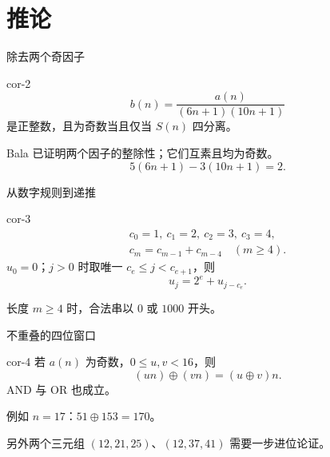 \documentclass{beamer}
\begin{document}
\section{推论}
\begin{frame}{除去两个奇因子}
\begin{bookresult}{cor-2}
\[
b(n)=\frac{a(n)}{(6n+1)(10n+1)}
\]
是正整数，且为奇数当且仅当 $S(n)$ 四分离。
\end{bookresult}
Bala 已证明两个因子的整除性；它们互素且均为奇数。
\[
5(6n+1)-3(10n+1)=2.
\]
\end{frame}
\begin{frame}{从数字规则到递推}
\begin{bookresult}{cor-3}
\[
\begin{aligned}
c_0=1,\ c_1=2,\ c_2=3,\ c_3=4,\\
c_m=c_{m-1}+c_{m-4}\quad(m\geq4).
\end{aligned}
\]
$u_0=0$；$j>0$ 时取唯一 $c_e\leq j<c_{e+1}$，则
\[
u_j=2^e+u_{j-c_e}.
\]
\end{bookresult}
长度 $m\geq4$ 时，合法串以 $0$ 或 $1000$ 开头。
\end{frame}
\begin{frame}{不重叠的四位窗口}
\begin{bookresult}{cor-4}
若 $a(n)$ 为奇数，$0\leq u,v<16$，则
\[
(un)\oplus(vn)=(u\oplus v)n.
\]
AND 与 OR 也成立。
\end{bookresult}
例如 $n=17$：$51\oplus153=170$。

另外两个三元组 $(12,21,25)$、$(12,37,41)$ 需要一步进位论证。
\end{frame}
\end{document}
